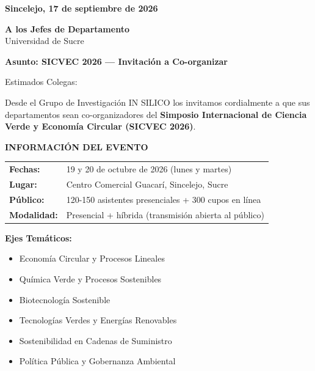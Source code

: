 \documentclass[12pt,a4paper]{article}
\begin{document}
\vspace{0.5cm}

\noindent
\textbf{Sincelejo, 17 de septiembre de 2026}

\vspace{0.4cm}

\noindent
\textbf{A los Jefes de Departamento}\\
Universidad de Sucre

\vspace{0.4cm}

\noindent
\textbf{\large Asunto: SICVEC 2026 — Invitación a Co-organizar}

\vspace{0.4cm}

Estimados Colegas:

\vspace{0.4cm}

Desde el Grupo de Investigación IN SILICO los invitamos cordialmente a que sus departamentos sean co-organizadores del \textbf{Simposio Internacional de Ciencia Verde y Economía Circular (SICVEC 2026)}.

\vspace{0.4cm}

\noindent
\textbf{INFORMACIÓN DEL EVENTO}

\begin{tabular}{ll}
\textbf{Fechas:} & 19 y 20 de octubre de 2026 (lunes y martes) \\
\textbf{Lugar:} & Centro Comercial Guacarí, Sincelejo, Sucre \\
\textbf{Público:} & 120-150 asistentes presenciales + 300 cupos en línea \\
\textbf{Modalidad:} & Presencial + híbrida (transmisión abierta al público) \\
\end{tabular}

\vspace{0.4cm}

\textbf{Ejes Temáticos:}
\begin{itemize}
  \item Economía Circular y Procesos Lineales
  \item Química Verde y Procesos Sostenibles
  \item Biotecnología Sostenible
  \item Tecnologías Verdes y Energías Renovables
  \item Sostenibilidad en Cadenas de Suministro
  \item Política Pública y Gobernanza Ambiental
\end{itemize}
\end{document}
